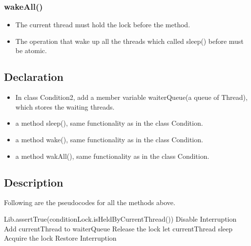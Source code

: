 \documentclass{article}
\begin{document}
	\subsubsection*{wakeAll()}
	\begin{itemize}
		\item The current thread must hold the lock before the method.
		
		\item The operation that wake up all the threads which called sleep() before must be atomic.
	\end{itemize}
	
	\subsection{Declaration}
	
	\begin{itemize}
		\item In class Condition2, add a member variable waiterQueue(a queue of Thread), which stores the waiting threads.
		
		\item a method sleep(), same functionality as in the class Condition.
		
		\item a method wake(), same functionality as in the class Condition.
		
		\item a method wakAll(), same functionality as in the class Condition.
	\end{itemize}
	
	\subsection{Description}
	
	Following are the pseudocodes for all the methods above.
	
	\begin{algorithm}[H]
		\begin{algorithmic}
				\State Lib.assertTrue(conditionLock.isHeldByCurrentThread())
				\State Disable Interruption
				\State Add currentThread to waiterQueue
				\State Release the lock
				\State let currentThread sleep
				\State Acquire the lock
				\State Restore Interruption
			\EndProcedure
		\end{algorithmic}
	\end{algorithm}
		
\end{document}
